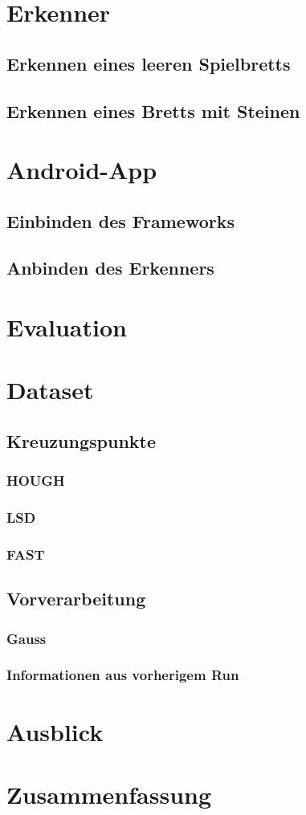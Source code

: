 
\chapter{Erkenner}
	\section{Erkennen eines leeren Spielbretts}
	\section{Erkennen eines Bretts mit Steinen}
\chapter{Android-App}
	\section{Einbinden des Frameworks}
	\section{Anbinden des Erkenners}
\chapter{Evaluation}
	\chapter{Dataset}
	\section{Kreuzungspunkte}
		\subsection{HOUGH}
		\subsection{LSD}
		\subsection{FAST}
	\section{Vorverarbeitung}
		\subsection{Gauss}
		\subsection{Informationen aus vorherigem Run}
\chapter{Ausblick}
\chapter{Zusammenfassung}
